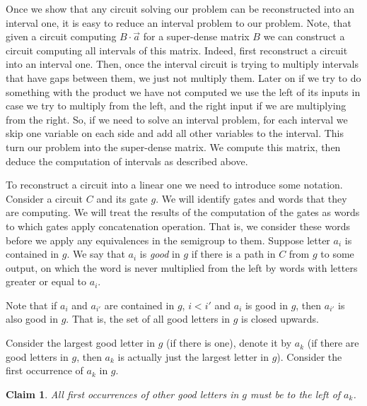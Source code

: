 \documentclass[11pt,letterpaper]{article}
\newtheorem{claim}{Claim}
\begin{document}
Once we show that any circuit solving our problem can be reconstructed into an interval one, it is easy to reduce an interval problem to our problem. Note, that given a circuit computing $B \cdot \vec{a}$ for a super-dense matrix $B$ we can construct a circuit computing all intervals of this matrix. Indeed, first reconstruct a circuit into an interval one. Then, once the interval circuit is trying to multiply intervals that have gaps  between them, we just not multiply them. Later on if we try to do something with the product we have not computed we use the left of its inputs in case we try to multiply from the left, and the right input if we are multiplying from the right. So, if we need to solve an interval problem, for each interval we skip one variable on each side and add all other variables to the interval. This turn our problem into the super-dense matrix. We compute this matrix, then deduce the computation of intervals as described above.


To reconstruct a circuit into a linear one we need to introduce some notation. Consider a circuit $C$ and its gate $g$. 
We will identify gates and words that they are computing. We will treat the results of the computation of the gates as words to which gates apply concatenation operation. That is, we consider these words before we apply any equivalences in the semigroup to them.
Suppose letter $a_i$ is contained in $g$. We say that $a_i$ is \emph{good} in $g$ if there is a path in $C$ from $g$ to some output, on which the word is never multiplied from the left by words with letters greater or equal to $a_i$. 

Note that if $a_i$ and $a_{i'}$ are contained in $g$, $i<i'$ and $a_i$ is good in $g$, then $a_{i'}$ is also good in $g$. That is, the set of all good letters in $g$ is closed upwards.

Consider the largest good letter in $g$ (if there is one), denote it by $a_k$ (if there are good letters in $g$, then $a_k$ is actually just the largest letter in $g$). Consider the first occurrence of $a_k$ in $g$. 

\begin{claim}
All first occurrences of other good letters in $g$ must be to the left of $a_k$. 
\end{claim}
\end{document}
